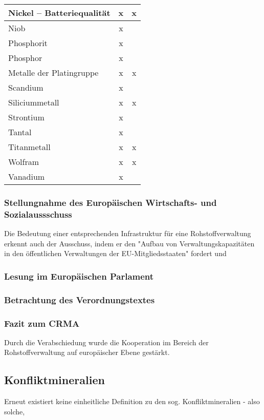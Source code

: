 \documentclass[12pt,a4paper,oneside]{book} %
\begin{document}
\begin{tabular}{|>{\raggedright}p{5cm}|c|c|}
		Nickel – Batteriequalität & x & x \\
		\hline
		Niob & x & \\
		\hline
		Phosphorit & x & \\
		\hline
		Phosphor & x & \\
		\hline
		Metalle der Platingruppe & x & x \\
		\hline
		Scandium & x & \\
		\hline
		Siliciummetall & x & x \\
		\hline
		Strontium & x & \\
		\hline
		Tantal & x & \\
		\hline
		Titanmetall & x & x \\
		\hline
		Wolfram & x & x \\
		\hline
		Vanadium & x & \\
		\hline
	\end{tabular}
	
	\subsubsection{Stellungnahme des Europäischen Wirtschafts- und Sozialaussschuss}
	
	Die Bedeutung einer entsprechenden Infrastruktur für eine Rohstoffverwaltung erkennt auch der Ausschuss, indem er den "Aufbau von Verwaltungskapazitäten in den öffentlichen Verwaltungen der EU-Mitgliedsstaaten" fordert %
	und 
	
	\subsubsection{Lesung im Europäischen Parlament}
	
	
	\subsubsection{Betrachtung des Verordnungstextes}
	
	\subsubsection{Fazit zum CRMA}
	Durch die Verabschiedung wurde die Kooperation im Bereich der Rohstoffverwaltung auf europäischer Ebene gestärkt.
	
	\subsection{Konfliktmineralien}
	Erneut existiert keine einheitliche Definition zu den sog. Konfliktmineralien - also solche, 
	
\end{document}
